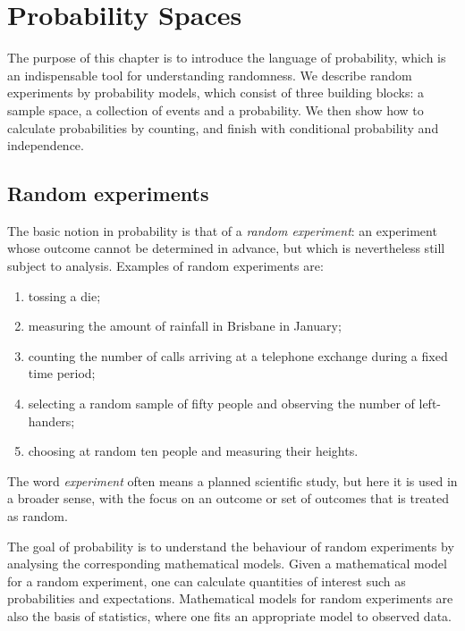 \chapter{Probability Spaces}\label{ch:probability-spaces}



The purpose of this chapter is to introduce the language of probability, which is an indispensable tool for understanding randomness. We describe random experiments by probability models, which consist of three building blocks: a sample space, a collection of events and a probability. We then show how to calculate probabilities by counting, and finish with conditional probability and independence.

\section{Random experiments}\label{sec:random-experiments}

The basic notion in probability is that of a \emph{random experiment}: an experiment whose outcome cannot be determined in advance, but which is nevertheless still subject to analysis. Examples of random experiments are:
\begin{enumerate}
  \item tossing a die;
  \item measuring the amount of rainfall in Brisbane in January;
  \item counting the number of calls arriving at a telephone exchange during a fixed time period;
  \item selecting a random sample of fifty people and observing the number of left-handers;
  \item choosing at random ten people and measuring their heights.
\end{enumerate}
The word \emph{experiment} often means a planned scientific study, but here it is used in a broader sense, with the focus on an outcome or set of outcomes that is treated as random.

The goal of probability is to understand the behaviour of random experiments by analysing the corresponding mathematical models. Given a mathematical model for a random experiment, one can calculate quantities of interest such as probabilities and expectations. Mathematical models for random experiments are also the basis of statistics, where one fits an appropriate model to observed data.

